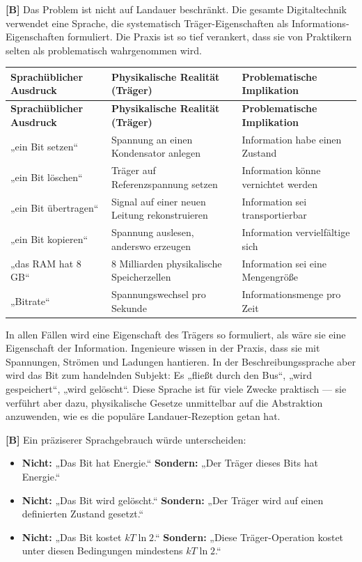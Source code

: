 \textbf{[B]} Das Problem ist nicht auf Landauer beschränkt. Die gesamte Digitaltechnik
verwendet eine Sprache, die systematisch Träger-Eigenschaften als
Informations-Eigenschaften formuliert. Die Praxis ist so tief verankert, dass sie
von Praktikern selten als problematisch wahrgenommen wird.

\begin{center}
\small
\begin{longtable}{@{}p{}p{}p{}@{}}
\toprule
\textbf{Sprachüblicher Ausdruck} & \textbf{Physikalische Realität (Träger)} & \textbf{Problematische Implikation} \\
\midrule
\endfirsthead
\toprule
\textbf{Sprachüblicher Ausdruck} & \textbf{Physikalische Realität (Träger)} & \textbf{Problematische Implikation} \\
\midrule
\endhead
„ein Bit setzen“ & Spannung an einen Kondensator anlegen & Information habe einen Zustand \\
„ein Bit löschen“ & Träger auf Referenzspannung setzen & Information könne vernichtet werden \\
„ein Bit übertragen“ & Signal auf einer neuen Leitung rekonstruieren & Information sei transportierbar \\
„ein Bit kopieren“ & Spannung auslesen, anderswo erzeugen & Information vervielfältige sich \\
„das RAM hat 8\,GB“ & 8 Milliarden physikalische Speicherzellen & Information sei eine Mengengröße \\
„Bitrate“ & Spannungswechsel pro Sekunde & Informationsmenge pro Zeit \\
\bottomrule
\end{longtable}
\end{center}

In allen Fällen wird eine Eigenschaft des Trägers so formuliert, als wäre sie eine
Eigenschaft der Information. Ingenieure wissen in der Praxis, dass sie mit
Spannungen, Strömen und Ladungen hantieren. In der Beschreibungssprache aber wird
das Bit zum handelnden Subjekt: Es „fließt durch den Bus“, „wird gespeichert“,
„wird gelöscht“. Diese Sprache ist für viele Zwecke praktisch --- sie verführt aber
dazu, physikalische Gesetze unmittelbar auf die Abstraktion anzuwenden, wie es die
populäre Landauer-Rezeption getan hat.

\textbf{[B]} Ein präziserer Sprachgebrauch würde unterscheiden:

\begin{itemize}[leftmargin=1.4em,itemsep=0.25em]
  \item \textbf{Nicht:} „Das Bit hat Energie.“ \quad
        \textbf{Sondern:} „Der Träger dieses Bits hat Energie.“
  \item \textbf{Nicht:} „Das Bit wird gelöscht.“ \quad
        \textbf{Sondern:} „Der Träger wird auf einen definierten Zustand gesetzt.“
  \item \textbf{Nicht:} „Das Bit kostet $kT\ln 2$.“ \quad
        \textbf{Sondern:} „Diese Träger-Operation kostet unter diesen Bedingungen
        mindestens $kT\ln 2$.“
\end{itemize}

